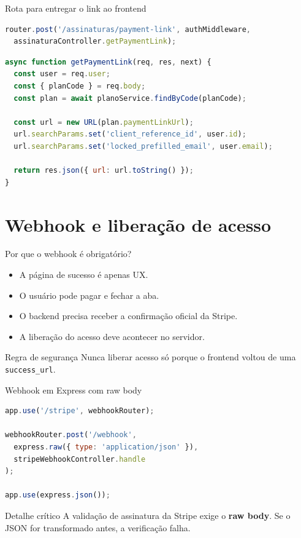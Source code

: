 \documentclass[aspectratio=169]{beamer}
\newcommand{\code}[1]{\texttt{#1}}
\begin{document}
\begin{frame}[fragile]{Rota para entregar o link ao frontend}
\begin{lstlisting}[language=JavaScript]
router.post('/assinaturas/payment-link', authMiddleware,
  assinaturaController.getPaymentLink);
\end{lstlisting}

\begin{lstlisting}[language=JavaScript]
async function getPaymentLink(req, res, next) {
  const user = req.user;
  const { planCode } = req.body;
  const plan = await planoService.findByCode(planCode);

  const url = new URL(plan.paymentLinkUrl);
  url.searchParams.set('client_reference_id', user.id);
  url.searchParams.set('locked_prefilled_email', user.email);

  return res.json({ url: url.toString() });
}
\end{lstlisting}
\end{frame}

\section{Webhook e liberação de acesso}

\begin{frame}{Por que o webhook é obrigatório?}
\begin{itemize}
  \item A página de sucesso é apenas UX.
  \item O usuário pode pagar e fechar a aba.
  \item O backend precisa receber a confirmação oficial da Stripe.
  \item A liberação do acesso deve acontecer no servidor.
\end{itemize}

\begin{alertblock}{Regra de segurança}
Nunca liberar acesso só porque o frontend voltou de uma \code{success\_url}.
\end{alertblock}
\end{frame}

\begin{frame}[fragile]{Webhook em Express com raw body}
\begin{lstlisting}[language=JavaScript]
app.use('/stripe', webhookRouter);

webhookRouter.post('/webhook',
  express.raw({ type: 'application/json' }),
  stripeWebhookController.handle
);

app.use(express.json());
\end{lstlisting}

\begin{alertblock}{Detalhe crítico}
A validação de assinatura da Stripe exige o \textbf{raw body}. Se o JSON for transformado antes, a verificação falha.
\end{alertblock}
\end{frame}
\end{document}
